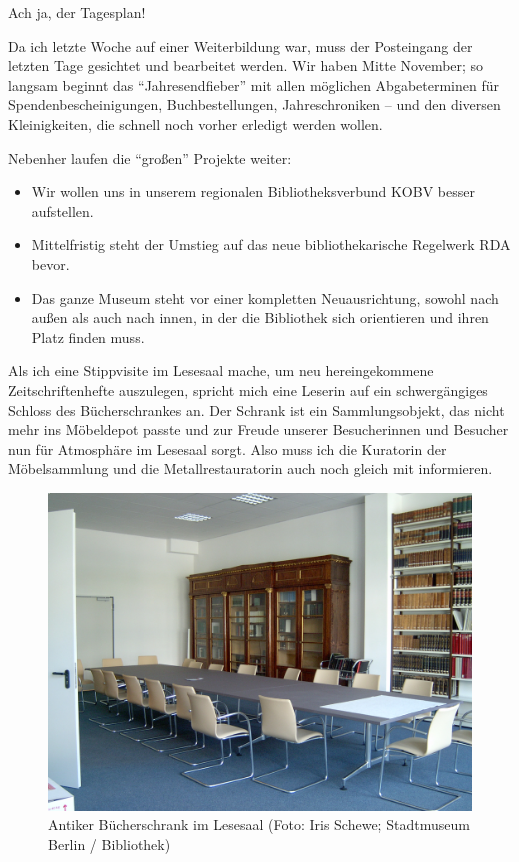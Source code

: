 \documentclass[a4paper,
fontsize=11pt,
oneside,
numbers=noperiodatend,
parskip=half-,
bibliography=totoc,
final
]{scrartcl}
\begin{document}
Ach ja, der Tagesplan!

Da ich letzte Woche auf einer Weiterbildung war, muss der Posteingang
der letzten Tage gesichtet und bearbeitet werden. Wir haben Mitte
November; so langsam beginnt das \enquote{Jahresendfieber} mit allen
möglichen Abgabeterminen für Spendenbescheinigungen, Buchbestellungen,
Jahreschroniken -- und den diversen Kleinigkeiten, die schnell noch
vorher erledigt werden wollen.

Nebenher laufen die \enquote{großen} Projekte weiter:

\begin{itemize}
\item
  Wir wollen uns in unserem regionalen Bibliotheksverbund KOBV besser
  aufstellen.
\item
  Mittelfristig steht der Umstieg auf das neue bibliothekarische
  Regelwerk RDA bevor.
\item
  Das ganze Museum steht vor einer kompletten Neuausrichtung, sowohl
  nach außen als auch nach innen, in der die Bibliothek sich orientieren
  und ihren Platz finden muss.
\end{itemize}

Als ich eine Stippvisite im Lesesaal mache, um neu hereingekommene
Zeitschriftenhefte auszulegen, spricht mich eine Leserin auf ein
schwergängiges Schloss des Bücherschrankes an. Der Schrank ist ein
Sammlungsobjekt, das nicht mehr ins Möbeldepot passte und zur Freude
unserer Besucherinnen und Besucher nun für Atmosphäre im Lesesaal sorgt.
Also muss ich die Kuratorin der Möbelsammlung und die
Metallrestauratorin auch noch gleich mit informieren.

\begin{figure}
\centering
\includegraphics{img/Schewe_2.jpg}
\caption{Antiker Bücherschrank im Lesesaal (Foto: Iris Schewe;
Stadtmuseum Berlin / Bibliothek)}
\end{figure}
\end{document}

